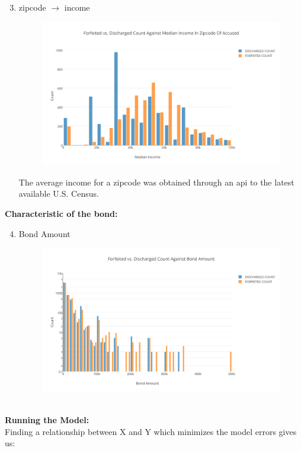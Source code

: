 \documentclass{article}
\begin{document}
\begin{enumerate}
\setcounter{enumi}{2}
\item zipcode $\rightarrow$ income
\begin{figure}[H]
\centering
\includegraphics[width=0.5\paperwidth]{Forfeited_vs_Discharged_Count_Against_Median_Income_In_Zipcode_Of_Accused.png}
\end{figure}

The average income for a zipcode was obtained through an api to the latest available U.S. Census.   
\end{enumerate}
\textbf{Characteristic of the bond:}
~\\
\begin{enumerate}
\setcounter{enumi}{3}
\item Bond Amount
\begin{figure}[H]
\centering
\includegraphics[width=0.5\paperwidth]{Forfeited_vs_Discharged_Count_Against_Bond_Amount.png}
\end{figure}
\end{enumerate}
~\\
\textbf{Running the Model:}
~\\
Finding a relationship between X and Y which minimizes the model errors gives us:
\end{document}
